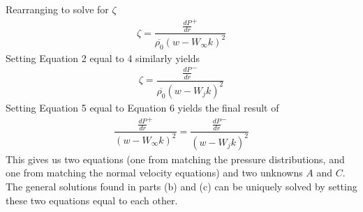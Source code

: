 \documentclass[onecolumn,10pt]{jhwhw}
\begin{document}
Rearranging to solve for $\zeta$
\begin{align}
\zeta = \dfrac{\frac{d P}{d r}^+} {\overline{\rho_0} \left(w - W_{\infty}k \right)^2 }
\end{align}
Setting Equation 2 equal to 4 similarly yields
\begin{align}
\zeta = \dfrac{\frac{d P}{d r}^-} {\overline{\rho_0} \left(w - W_{j}k \right)^2 }
\end{align}
Setting Equation 5 equal to Equation 6 yields the final result of
\begin{align}
\dfrac{\frac{d P}{d r}^+} {\left(w - W_{\infty}k \right)^2 } = \dfrac{\frac{d P}{d r}^-} {\left(w - W_{j}k \right)^2 }
\end{align}
This gives us two equations (one from matching the pressure distributions, and one from matching the normal velocity equations) and two unknowns $A$ and $C$. The general solutions found in parts (b) and (c) can be uniquely solved by setting these two equations equal to each other.
\end{document}
